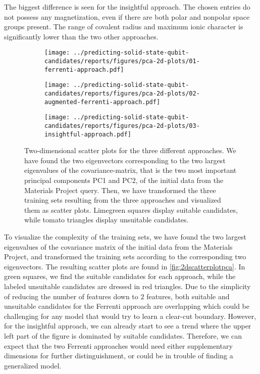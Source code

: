 The biggest difference is seen for the insightful approach. The chosen entries do not possess any magnetization, even if there are both polar and nonpolar space groups present. The range of covalent radius and maximum ionic character is significantly lower than the two other approaches.

\begin{figure}[!tbp]
    \centering
    \begin{subfigure}{0.5\textwidth}
        \centering
        \texttt{[image: ../predicting-solid-state-qubit-candidates/reports/figures/pca-2d-plots/01-ferrenti-approach.pdf]}
    \end{subfigure}%
    \begin{subfigure}{0.5\textwidth}
        \centering
        \texttt{[image: ../predicting-solid-state-qubit-candidates/reports/figures/pca-2d-plots/02-augmented-ferrenti-approach.pdf]}
    \end{subfigure}
    \begin{subfigure}{0.5\textwidth}
        \centering
        \texttt{[image: ../predicting-solid-state-qubit-candidates/reports/figures/pca-2d-plots/03-insightful-approach.pdf]}
    \end{subfigure}
    \vspace*{-95mm}
    \caption{Two-dimensional scatter plots for the three different approaches. We have found the two eigenvectors corresponding to the two largest eigenvalues of the covariance-matrix, that is the two most important principal components PC1 and PC2, of the initial data from the Materials Project query. Then, we have transformed the three training sets resulting from the three approaches and visualized them as scatter plots. Limegreen squares display suitable candidates, while tomato triangles display unsuitable candidates.}
    \label{fig:2dscatterplotpca}
\end{figure}

To visualize the complexity of the training sets, we have found the two largest eigenvalues of the covariance matrix of the initial data from the Materials Project, and transformed the training sets according to the corresponding two eigenvectors. The resulting scatter plots are found in \autoref{fig:2dscatterplotpca}. In green squares, we find the suitable candidates for each approach, while the labeled unsuitable candidates are dressed in red triangles. Due to the simplicity of reducing the number of features down to $2$ features, both suitable and unsuitable candidates for the Ferrenti approach are overlapping which could be challenging for any model that would try to learn a clear-cut boundary. However, for the insightful approach, we can already start to see a trend where the upper left part of the figure is dominated by suitable candidates. Therefore, we can expect that the two Ferrenti approaches would need either supplementary dimensions for further distinguishment, or could be in trouble of finding a generalized model.



